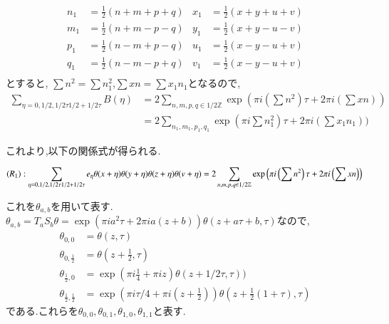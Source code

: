 \documentclass[uplatex,b5j,11pt]{jsbook}
\begin{document}
\begin{align*}
    n_1 & = \frac{1}{2}(n+m+p+q) & x_1 & = \frac{1}{2}(x+y+u+v) \\
    m_1 & = \frac{1}{2}(n+m-p-q) & y_1 & = \frac{1}{2}(x+y-u-v) \\
    p_1 & = \frac{1}{2}(n-m+p-q) & u_1 & = \frac{1}{2}(x-y-u+v) \\
    q_1 & = \frac{1}{2}(n-m-p+q) & v_1 & = \frac{1}{2}(x-y-u+v) \\
\end{align*}
とすると,
$\sum n^2 = \sum n_1^2$,$\sum xn = \sum x_1 n_1$となるので,
\begin{align*}
\sum_{\eta = 0, 1/2, 1/2\tau 1/2 + 1/2\tau} B(\eta) & = 2 \sum_{n,m,p,q \in 1/2 \mathbb{Z}}  \exp\left( \pi i \left(\sum n^2 \right) \tau + 2 \pi i \left(\sum xn \right) \right) \\
 & = 2 \sum_{n_1, m_1, p_1, q_1} \exp(\pi i \sum n_1^2) \tau + 2 \pi i (\sum x_1n_1))
\end{align*}


これより,以下の関係式が得られる.

\begin{equation*}
(R_1):
\sum_{\eta = 0, 1/2, 1/2\tau 1/2 + 1/2\tau} e_{\eta}\theta(x+\eta)\theta(y+\eta)\theta(z+\eta)\theta(v+\eta)  = 2 \sum_{n,m,p,q \in 1/2 \mathbb{Z}}  \exp\left( \pi i \left(\sum n^2 \right) \tau + 2 \pi i \left(\sum xn \right) \right) \\
\end{equation*}


これを$\theta_{a,b}$を用いて表す.
$\theta_{a,b} = T_aS_b\theta = \exp(\pi i a^2\tau + 2\pi i a(z+b))\theta(z+a\tau + b, \tau)$なので,
\begin{align*}
\theta_{0,0} & = \theta(z, \tau) \\
\theta_{0,\frac{1}{2}} &= \theta(z + \frac{1}{2}, \tau) \\
\theta_{\frac{1}{2},0} &= \exp(\pi i \frac{1}{4} + \pi i z )\theta(z+1/2\tau, \tau)) \\
\theta_{\frac{1}{2}, \frac{1}{2}} &= \exp(\pi i \tau/4 + \pi i (z + \frac{1}{2}))\theta(z + \frac{1}{2}(1 + \tau), \tau)
\end{align*}
である.これらを$\theta_{0,0}, \theta_{0,1}, \theta_{1,0}, \theta_{1,1}$と表す.
\end{document}
